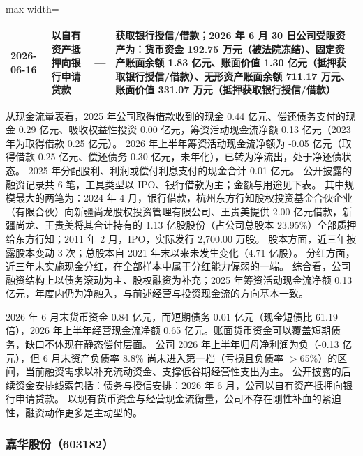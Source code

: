 \begin{center}
\begin{adjustbox}{max width=\textwidth}
\begin{tabular}{@{}p{1.45cm}p{2.55cm}p{4.05cm}p{4.95cm}@{}}
2026-06-16 & 以自有资产抵押向银行申请贷款 & --- & 获取银行授信/\allowbreak{}借款；2026 年 6 月 30 日公司受限资产为：货币资金 192.75 万元（被法院冻结）、\allowbreak{}固定资产账面余额 1.83 亿元、\allowbreak{}账面价值 1.30 亿元（抵押获取银行授信/\allowbreak{}借款）、\allowbreak{}无形资产账面余额 711.17 万元、\allowbreak{}账面价值 331.07 万元（抵押获取银行授信/\allowbreak{}借款） \\
\bottomrule
\end{tabular}
\end{adjustbox}
\end{center}

 从现金流量表看，2025 年公司取得借款收到的现金 0.44 亿元、偿还债务支付的现金 0.29 亿元、吸收权益性投资 0.00 亿元，筹资活动现金流净额 0.13 亿元（2023 年为取得借款 0.25 亿元）。 2026 年上半年筹资活动现金流净额为 -0.05 亿元（取得借款 0.25 亿元、偿还债务 0.30 亿元，未年化），已转为净流出，处于净还债状态。 2025 年分配股利、利润或偿付利息支付的现金合计 0.01 亿元。 公开披露的融资记录共 6 笔，工具类型以 IPO、银行借款为主；金额与用途见下表。 其中规模最大的两笔为：2024 年 4 月，银行借款，杭州东方行知股权投资基金合伙企业（有限合伙）向新疆尚龙股权投资管理有限公司、王贵美提供 2.00 亿元借款，新疆尚龙、王贵美将其合计持有的 1.13 亿股股份（占公司总股本 23.95\%）全部质押给东方行知；2011 年 2 月，IPO，实际发行 2,700.00 万股。 股本方面，近三年披露股本变动 3 次；总股本自 2021 年末以来未发生变化（4.71 亿股）。 分红方面，近三年未实施现金分红，在全部样本中属于分红能力偏弱的一端。 综合看，公司融资结构上以债务滚动为主、股权融资为补充；2025 年筹资活动现金流净额 0.13 亿元，年度内仍为净融入，与前述经营与投资现金流的方向基本一致。

 2026 年 6 月末货币资金 0.84 亿元，而短期债务 0.01 亿元（现金短债比 61.19 倍），2026 年上半年经营现金流净额 0.65 亿元。账面货币资金可以覆盖短期债务，缺口不体现在静态偿付层面。 公司 2026 年上半年归母净利润为负（-0.13 亿元），但 6 月末资产负债率 8.8\% 尚未进入第一档（亏损且负债率 $>$65\%）的区间，当前融资需求以补充流动资金、支撑低谷期经营性支出为主。 公开披露的后续资金安排线索包括：债务与授信安排：2026 年 6 月，公司以自有资产抵押向银行申请贷款。 以现有货币资金与经营现金流衡量，公司不存在刚性补血的紧迫性，融资动作更多是主动型的。




\subsubsection{嘉华股份（603182）}
\label{co:603182}

